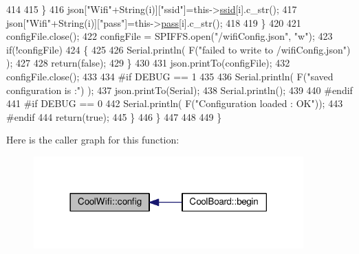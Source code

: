 \begin{DoxyCode}
414                     
415                 \}
416                 json[\textcolor{stringliteral}{"Wifi"}+String(i)][\textcolor{stringliteral}{"ssid"}]=this->\hyperlink{class_cool_wifi_a893b21d0fed821438733bba2e73fb4c2}{ssid}[i].c\_str();
417                 json[\textcolor{stringliteral}{"Wifi"}+String(i)][\textcolor{stringliteral}{"pass"}]=this->\hyperlink{class_cool_wifi_a0c3332a149245aaad060b32593a54c9b}{pass}[i].c\_str();           
418                         
419             \}
420 
421             configFile.close();
422             configFile = SPIFFS.open(\textcolor{stringliteral}{"/wifiConfig.json"}, \textcolor{stringliteral}{"w"});
423             \textcolor{keywordflow}{if}(!configFile)
424             \{
425             
426                 Serial.println( F(\textcolor{stringliteral}{"failed to write to /wifiConfig.json"}) );
427             
428                 \textcolor{keywordflow}{return}(\textcolor{keyword}{false});              
429             \}
430             
431             json.printTo(configFile);
432             configFile.close();
433 
434 \textcolor{preprocessor}{        #if DEBUG == 1 }
435 
436             Serial.println( F(\textcolor{stringliteral}{"saved configuration is :"}) );
437             json.printTo(Serial);
438             Serial.println();
439         
440 \textcolor{preprocessor}{        #endif}
441 \textcolor{preprocessor}{        #if DEBUG == 0}
442             Serial.println( F(\textcolor{stringliteral}{"Configuration loaded : OK"}));
443 \textcolor{preprocessor}{        #endif}
444             \textcolor{keywordflow}{return}(\textcolor{keyword}{true}); 
445         \}
446     \}   
447     
448 
449 \}
\end{DoxyCode}
Here is the caller graph for this function\+:\nopagebreak
\begin{figure}[H]
\begin{center}
\leavevmode
\includegraphics[width=294pt]{d7/d29/class_cool_wifi_a4eb2f6b9b09dd588964b88b6c70122c0_icgraph}
\end{center}
\end{figure}
\mbox{\label{class_cool_wifi_a2a9a546f76816c8c5c8e2d46a6c4f07d}} 
